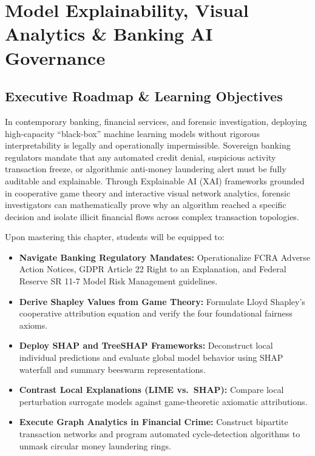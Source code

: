 \chapter{Model Explainability, Visual Analytics \& Banking AI Governance}

\section{Executive Roadmap \& Learning Objectives}

In contemporary banking, financial services, and forensic investigation, deploying high-capacity ``black-box'' machine learning models without rigorous interpretability is legally and operationally impermissible. Sovereign banking regulators mandate that any automated credit denial, suspicious activity transaction freeze, or algorithmic anti-money laundering alert must be fully auditable and explainable. Through Explainable AI (XAI) frameworks grounded in cooperative game theory and interactive visual network analytics, forensic investigators can mathematically prove why an algorithm reached a specific decision and isolate illicit financial flows across complex transaction topologies.

\begin{tcolorbox}[colback=primarylight, colframe=primarydark, title={\textbf{Core Learning Competencies}}]
Upon mastering this chapter, students will be equipped to:
\begin{itemize}
    \item \textbf{Navigate Banking Regulatory Mandates:} Operationalize FCRA Adverse Action Notices, GDPR Article 22 Right to an Explanation, and Federal Reserve SR 11-7 Model Risk Management guidelines.
    \item \textbf{Derive Shapley Values from Game Theory:} Formulate Lloyd Shapley's cooperative attribution equation and verify the four foundational fairness axioms.
    \item \textbf{Deploy SHAP and TreeSHAP Frameworks:} Deconstruct local individual predictions and evaluate global model behavior using SHAP waterfall and summary beeswarm representations.
    \item \textbf{Contrast Local Explanations (LIME vs.~SHAP):} Compare local perturbation surrogate models against game-theoretic axiomatic attributions.
    \item \textbf{Execute Graph Analytics in Financial Crime:} Construct bipartite transaction networks and program automated cycle-detection algorithms to unmask circular money laundering rings.
\end{itemize}
\end{tcolorbox}

